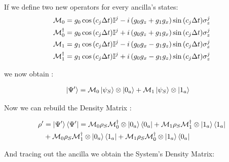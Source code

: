 \documentclass[a4paper,12pt]{article}
\begin{document}
	  If we define two new operators for every ancilla's states:
	  \begin{align*}
	  	\mathcal{M}_0 &= g_0 \cos{\left(c_j \Delta t \right)} \mathbb{I}^{j} - i \left(g_0 g_z + g_1 g_x \right) \sin{\left(c_j \Delta t \right)} \sigma_{z}^{j} \\
	  	\mathcal{M}_{0}^{\dagger} &= g_0 \cos{\left(c_j \Delta t \right)} \mathbb{I}^{j} + i \left(g_0 g_z + g_1 g_x \right) \sin{\left(c_j \Delta t \right)} \sigma_{z}^{j} \\
	  	\mathcal{M}_1 &= g_1 \cos{\left(c_j \Delta t \right)} \mathbb{I}^{j} - i \left(g_0 g_x - g_1 g_z \right) \sin{\left(c_j \Delta t \right)} \sigma_{z}^{j} \\
	  	\mathcal{M}_{1}^{\dagger} &= g_1 \cos{\left(c_j \Delta t \right)} \mathbb{I}^{j} + i \left(g_0 g_x - g_1 g_z \right) \sin{\left(c_j \Delta t \right)} \sigma_{z}^{j} \notag \\
	  \end{align*}
	  	
	  we now obtain : 
	  	
	  \begin{align}
	  	\ket{\Psi'} &= \mathcal{M}_0 \ket{\psi_S} \otimes \ket{0_a} + \mathcal{M}_1 \ket{\psi_S} \otimes \ket{1_a}
	  \end{align}
	  	
	 Now we can rebuild the Density Matrix :
	  	
	 \begin{align}\label{eq : rho interm.}
	 	\rho' &= \ket{\Psi'}\bra{\Psi'} = \mathcal{M}_{0} \rho_S \mathcal{M}_{0}^{\dagger} \otimes \ket{0_a}\bra{0_a} + \mathcal{M}_{1} \rho_S \mathcal{M}_{1}^{\dagger} \otimes \ket{1_a} \bra{1_a} \notag \\
	 	& + \mathcal{M}_{0} \rho_S \mathcal{M}_{1}^{\dagger} \otimes \ket{0_a} \bra{1_a} + \mathcal{M}_{1} \rho_S \mathcal{M}_{0}^{\dagger} \otimes \ket{1_a} \bra{0_a}
	 \end{align}
	  	
	 And tracing out the ancilla we obtain the System's Density Matrix:
	  	
\end{document}
